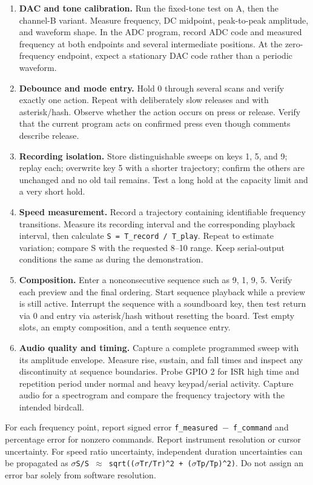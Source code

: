 \documentclass[11pt,letterpaper]{article}
\begin{document}
\begin{enumerate}
\item \textbf{DAC and tone calibration.} Run the fixed-tone test on A, then the channel-B variant. Measure frequency, DC midpoint, peak-to-peak amplitude, and waveform shape. In the ADC program, record ADC code and measured frequency at both endpoints and several intermediate positions. At the zero-frequency endpoint, expect a stationary DAC code rather than a periodic waveform.
\item \textbf{Debounce and mode entry.} Hold 0 through several scans and verify exactly one action. Repeat with deliberately slow releases and with asterisk/hash. Observe whether the action occurs on press or release. Verify that the current program acts on confirmed press even though comments describe release.
\item \textbf{Recording isolation.} Store distinguishable sweeps on keys 1, 5, and 9; replay each; overwrite key 5 with a shorter trajectory; confirm the others are unchanged and no old tail remains. Test a long hold at the capacity limit and a very short hold.
\item \textbf{Speed measurement.} Record a trajectory containing identifiable frequency transitions. Measure its recording interval and the corresponding playback interval, then calculate \texttt{S = T\_record / T\_play}. Repeat to estimate variation; compare S with the requested 8--10 range. Keep serial-output conditions the same as during the demonstration.
\item \textbf{Composition.} Enter a nonconsecutive sequence such as 9, 1, 9, 5. Verify each preview and the final ordering. Start sequence playback while a preview is still active. Interrupt the sequence with a soundboard key, then test return via 0 and entry via asterisk/hash without resetting the board. Test empty slots, an empty composition, and a tenth sequence entry.
\item \textbf{Audio quality and timing.} Capture a complete programmed sweep with its amplitude envelope. Measure rise, sustain, and fall times and inspect any discontinuity at sequence boundaries. Probe GPIO 2 for ISR high time and repetition period under normal and heavy keypad/serial activity. Capture audio for a spectrogram and compare the frequency trajectory with the intended birdcall.
\end{enumerate}

For each frequency point, report signed error \texttt{f\_measured \ensuremath{-} f\_command} and percentage error for nonzero commands. Report instrument resolution or cursor uncertainty. For speed ratio uncertainty, independent duration uncertainties can be propagated as \texttt{\ensuremath{\sigma}S/S \ensuremath{\approx} sqrt((\ensuremath{\sigma}Tr/Tr)\textasciicircum{}2 + (\ensuremath{\sigma}Tp/Tp)\textasciicircum{}2)}. Do not assign an error bar solely from software resolution.
\end{document}
